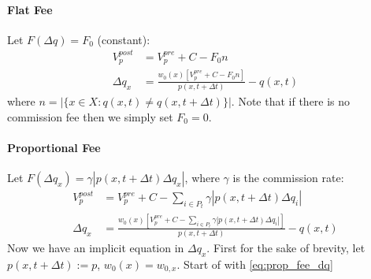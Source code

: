 \documentclass[12pt]{article}
\begin{document}
\paragraph{Flat Fee}
Let $ F(\Delta q) = F_0 $ (constant):
\begin{align}
V_p^{post} &= V_p^{pre} + C - F_0 n \label{eq:flat_fee_vp}\\
\Delta q_x &= \frac{w_0(x) [V_p^{pre} + C - F_0 n]}{p(x, t + \Delta t)} - q(x,t)
\label{eq:flat_fee_dq}
\end{align}
where $ n = |\{x \in X : q(x,t) \neq q(x,t + \Delta t)\}| $.
Note that if there is no commission fee then we simply set $F_0 = 0$.
\paragraph{Proportional Fee}

Let $ F(\Delta q_x) = \gamma |p(x, t + \Delta t) \Delta q_x| $, where $ \gamma $ is the commission rate:
\begin{align}
V_p^{post} &= V_p^{pre} + C - \sum_{i \in P_t}\gamma |p(x,t + \Delta t) \Delta q_i| \label{eq:prop_fee_vp}\\
\Delta q_x &= \frac{w_0(x) [V_p^{pre} + C - \sum_{i \in P_t}\gamma |p(x,t + \Delta t) \Delta q_i|]}{p(x, t + \Delta t)} - q(x,t)
\label{eq:prop_fee_dq}
\end{align}
Now we have an implicit equation in $\Delta q_x$. First for the sake of brevity, let 
$p(x , t + \Delta t) := p$, $w_{0}(x) = w_{0, x}$. Start of with \ref{eq:prop_fee_dq}
\end{document}
